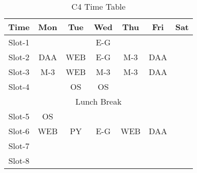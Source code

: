 \documentclass{article}
\begin{document}
	\begin{table}[h]
		\centering
		
		\begin{tabular}{|c|c|c|c|c|c|c|}
			\hline
			\textbf{Time} & \textbf{Mon} & \textbf{Tue} & \textbf{Wed} & \textbf{Thu} & \textbf{Fri} & \textbf{Sat} \\
			\hline
			Slot-1 &  &  & \cellcolor{red} E-G &  &  & \\
			\hline
			Slot-2 & \cellcolor{orange} DAA & \cellcolor{yellow} WEB & \cellcolor{red} E-G & \cellcolor{blue!40} M-3 & \cellcolor{orange} DAA &\\
			\hline
			Slot-3 & \cellcolor{blue!40} M-3 & \cellcolor{yellow} WEB & \cellcolor{blue!40} M-3 & \cellcolor{blue!40} M-3 & \cellcolor{orange} DAA &\\
			\hline
			Slot-4 &  & \cellcolor{green}OS & \cellcolor{green} OS &  &  & \\
			\hline
			\multicolumn{7}{|c|}{Lunch Break} \\
			\hline
			Slot-5 & \cellcolor{green} OS & \cellcolor{blue!20} & \cellcolor{red} & \cellcolor{yellow} & \cellcolor{orange} & \\
			\cline{1-2} \cline{7-1}
			Slot-6 & \cellcolor{yellow} WEB & \cellcolor{blue!20} PY & \cellcolor{red} E-G & \cellcolor{yellow} WEB & \cellcolor{orange} DAA & \\
			\cline{1-2} \cline{7-1}
			Slot-7 &  & \cellcolor{blue!20} & \cellcolor{red} & \cellcolor{yellow} & \cellcolor{orange} & \\
			\hline
			Slot-8 &  &  &  &  &  & \\
			\hline
		\end{tabular}
		\caption{C4 Time Table}
		\label{tab:example}
	\end{table}
\end{document}
